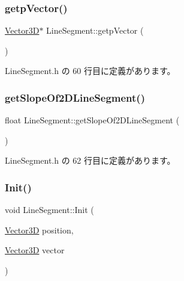 \mbox{\label{class_line_segment_a50ed66faa77529e1ef71bbc8714d7edc}} 
\subsubsection{\texorpdfstring{getp\+Vector()}{getpVector()}}
{\footnotesize\ttfamily \mbox{\hyperlink{class_vector3_d}{Vector3D}}$\ast$ Line\+Segment\+::getp\+Vector (\begin{DoxyParamCaption}{ }\end{DoxyParamCaption})\hspace{0.3cm}{\ttfamily [inline]}}



 Line\+Segment.\+h の 60 行目に定義があります。

\mbox{\label{class_line_segment_a473738a0b67e449cf8b5a23f1146f446}} 
\subsubsection{\texorpdfstring{get\+Slope\+Of2\+D\+Line\+Segment()}{getSlopeOf2DLineSegment()}}
{\footnotesize\ttfamily float Line\+Segment\+::get\+Slope\+Of2\+D\+Line\+Segment (\begin{DoxyParamCaption}{ }\end{DoxyParamCaption})\hspace{0.3cm}{\ttfamily [inline]}}



 Line\+Segment.\+h の 62 行目に定義があります。

\mbox{\label{class_line_segment_a38c6ff9ade1d084219ea9c9ae88eb5c7}} 
\subsubsection{\texorpdfstring{Init()}{Init()}}
{\footnotesize\ttfamily void Line\+Segment\+::\+Init (\begin{DoxyParamCaption}\item[{\mbox{\hyperlink{class_vector3_d}{Vector3D}}}]{position,  }\item[{\mbox{\hyperlink{class_vector3_d}{Vector3D}}}]{vector }\end{DoxyParamCaption})\hspace{0.3cm}{\ttfamily [inline]}}



